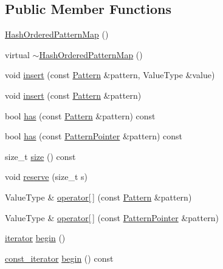 \subsection*{Public Member Functions}
\begin{DoxyCompactItemize}
\item 
\hyperlink{classHashOrderedPatternMap_a8a1cb7250cb05276f9600af5283b376d}{Hash\+Ordered\+Pattern\+Map} ()
\item 
virtual \hyperlink{classHashOrderedPatternMap_a85d05fb0c6dcc95e7117c662967ccfdc}{$\sim$\+Hash\+Ordered\+Pattern\+Map} ()
\item 
void \hyperlink{classHashOrderedPatternMap_aec9cfa54723fbe49e75a4e93109ed0bf}{insert} (const \hyperlink{classPattern}{Pattern} \&pattern, Value\+Type \&value)
\item 
void \hyperlink{classHashOrderedPatternMap_a177fda1eb621d00266632cbf26025e8b}{insert} (const \hyperlink{classPattern}{Pattern} \&pattern)
\item 
bool \hyperlink{classHashOrderedPatternMap_a8682c2810f85d0c80ed015e388b571ef}{has} (const \hyperlink{classPattern}{Pattern} \&pattern) const 
\item 
bool \hyperlink{classHashOrderedPatternMap_ae2b83d2bcc1378b817044c205bd60651}{has} (const \hyperlink{classPatternPointer}{Pattern\+Pointer} \&pattern) const 
\item 
size\+\_\+t \hyperlink{classHashOrderedPatternMap_a5a48798964b7d667950f41630d3bf708}{size} () const 
\item 
void \hyperlink{classHashOrderedPatternMap_a76f7eb2593bf60ba2bc25f23ff6655f4}{reserve} (size\+\_\+t s)
\item 
Value\+Type \& \hyperlink{classHashOrderedPatternMap_ac37c92e91eb149eaa271054156264328}{operator\mbox{[}$\,$\mbox{]}} (const \hyperlink{classPattern}{Pattern} \&pattern)
\item 
Value\+Type \& \hyperlink{classHashOrderedPatternMap_a65a2aa5b240f6d88b205273331f212b9}{operator\mbox{[}$\,$\mbox{]}} (const \hyperlink{classPatternPointer}{Pattern\+Pointer} \&pattern)
\item 
\hyperlink{classHashOrderedPatternMap_a149481ae49379713dae0ffcaff294f65}{iterator} \hyperlink{classHashOrderedPatternMap_ac103913725b7036ba414453b2204b955}{begin} ()
\item 
\hyperlink{classHashOrderedPatternMap_a0162fc35654440e11ea66e71e8ffe8f8}{const\+\_\+iterator} \hyperlink{classHashOrderedPatternMap_a8bf9b181f9e7ed899ba48918af7a255d}{begin} () const 
\item 

\end{DoxyCompactItemize}
